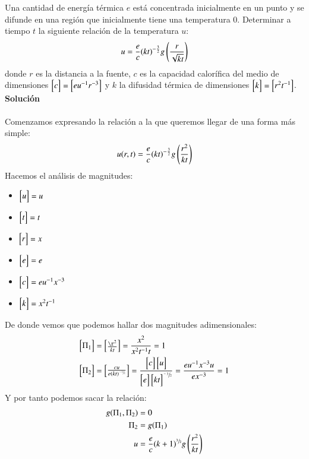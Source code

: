 \begin{ex}[H1.2]
    Una cantidad de energía térmica $e$ está concentrada inicialmente en un
    punto y se difunde en una región que inicialmente tiene una temperatura 0. Determinar a tiempo $t$ la siguiente relación de la temperatura $u$:
    $$
        u = \frac{e}{c}(kt)^{-\frac{3}{2}}g\left(\frac{r}{\sqrt{kt}}\right)
    $$
    donde $r$ es la distancia a la fuente, $c$ es la capacidad calorífica del medio de dimensiones $\mx{c} = \mx{eu^{-1}r^{-3}} $ y $k$ la difusidad térmica de dimensiones $\mx{k} = \mx{r^2t^{-1}}$.\\

    \textbf{Solución}\\\\
    Comenzamos expresando la relación a la que queremos llegar de una forma más simple:
    $$
        u(r, t) = \frac{e}{c}(kt)^{-\frac{3}{2}}g\left(\frac{r^2}{kt}\right)
    $$
    Hacemos el análisis de magnitudes:
    \begin{itemize}
        \item $\mx{u} = u$
        \item $\mx{t} = t$
        \item $\mx{r} = x$
        \item $\mx{e} = e$
        \item $\mx{c} = e u^{-1} x^{-3}$
        \item $\mx{k} = x^2 t^{-1}$
    \end{itemize}
    De donde vemos que podemos hallar dos magnitudes adimensionales:
    \begin{align*}
        \mx{\Pi_1} &= \mx{\frac{\r^2}{kt}} = \frac{x^2}{x^2t^{-1}t} = 1\\
        \mx{\Pi_2} &= \mx{\frac{cu}{e(kt)^{\sfrac{-3}{2}}}} = \frac{\mx{c} \mx{u}}{\mx{e} \mx{kt}^{\sfrac{-3}{2}}} = \frac{eu^{-1}x^{-3}u}{ex^{-3}} = 1
    \end{align*}
    Y por tanto podemos sacar la relación:
    \begin{align*}
        g(\Pi_1, \Pi_2) &= 0\\
        \Pi_2 &= g(\Pi_1)\\
        u &= \frac{e}{c} (k+1)^{\sfrac{3}{2}} g\left(\frac{r^2}{kt}\right)
    \end{align*}
\end{ex}
